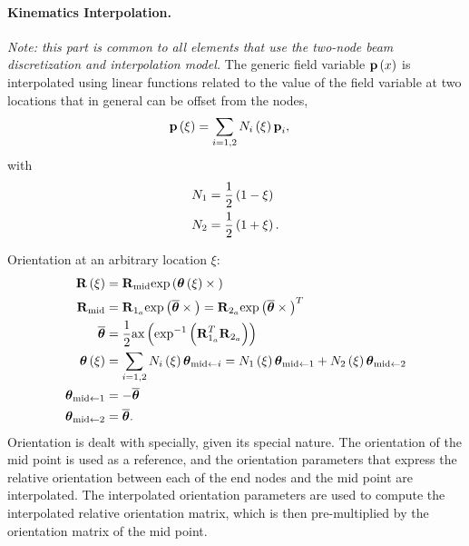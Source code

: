 \paragraph{Kinematics Interpolation.}
\emph{Note: this part is common to all elements that use the
two-node beam discretization and interpolation model.}
The generic field variable $\bm{\mathbf{p}}\left( x \right)$ is interpolated
using linear functions related to the value of the field 
variable at two locations that in general can be offset
from the nodes,
\begin{align}
	\bm{\mathbf{p}}\left( \xi \right)
	&=
	\sum_{i=1,2} N_i\left( \xi \right) \bm{\mathbf{p}}_i
	,
\end{align}
with
\begin{subequations}
\label{eq:aero:beam2:N}
\begin{align}
	N_1 &= \frac{1}{2} \left( 1 - \xi \right)
	\\
	N_2 &= \frac{1}{2} \left( 1 + \xi \right)
	.
\end{align}
\end{subequations}

Orientation at an arbitrary location $\xi$:
\begin{align}
	\bm{\mathbf{R}}\left( \xi \right)
	&=
	\bm{\mathbf{R}}_{\text{mid}} \text{exp}\left( \bm{\mathbf{\theta}}\left( \xi \right)\times{} \right)
	\\
	\bm{\mathbf{R}}_{\text{mid}}
	&=
	\bm{\mathbf{R}}_{1_a} \text{exp}\left( \overline{\bm{\mathbf{\theta}}}\times{} \right)
	= \bm{\mathbf{R}}_{2_a} \text{exp}\left( \overline{\bm{\mathbf{\theta}}}\times{} \right)^T
	\\
	\overline{\bm{\mathbf{\theta}}}
	&=
	\frac{1}{2} \text{ax}\left( \text{exp}^{-1}\left( \bm{\mathbf{R}}_{1_a}^T \bm{\mathbf{R}}_{2_a} \right) \right)
	\\
	\bm{\mathbf{\theta}}\left( \xi \right)
	&=
	\sum_{i=1,2} N_i\left( \xi \right) \bm{\mathbf{\theta}}_{\text{mid}\leftarrow i}
	= N_1\left( \xi \right) \bm{\mathbf{\theta}}_{\text{mid}\leftarrow 1}
		+ N_2\left( \xi \right) \bm{\mathbf{\theta}}_{\text{mid}\leftarrow 2}
	\\
	\bm{\mathbf{\theta}}_{\text{mid}\leftarrow 1}
	&= -\overline{\bm{\mathbf{\theta}}}
	\\
	\bm{\mathbf{\theta}}_{\text{mid}\leftarrow 2}
	&=
	\overline{\bm{\mathbf{\theta}}}
	.
\end{align}
Orientation is dealt with specially, given its special nature.
The orientation of the mid point is used as a reference,
and the orientation parameters that express the relative orientation
between each of the end nodes and the mid point are interpolated.
The interpolated orientation parameters are used to compute
the interpolated relative orientation matrix, which is then
pre-multiplied by the orientation matrix of the mid point.

